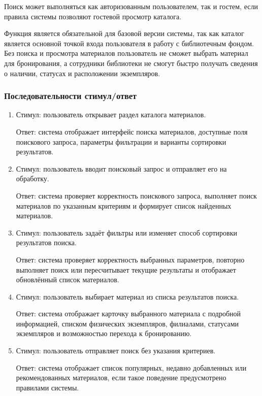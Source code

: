 \documentclass[12pt,a4paper]{article}
\begin{document}
	Поиск может выполняться как авторизованным пользователем, так и гостем, если
	правила системы позволяют гостевой просмотр каталога.
	
	Функция является обязательной для базовой версии системы, так как каталог
	является основной точкой входа пользователя в работу с библиотечным фондом.
	Без поиска и просмотра материалов пользователь не сможет выбрать материал
	для бронирования, а сотрудники библиотеки не смогут быстро получать сведения
	о наличии, статусах и расположении экземпляров.
	
	\subsubsection{Последовательности стимул/ответ}
	
	\begin{enumerate}
		\item Стимул: пользователь открывает раздел каталога материалов.
		
		Ответ: система отображает интерфейс поиска материалов, доступные поля
		поискового запроса, параметры фильтрации и варианты сортировки результатов.
		
		\item Стимул: пользователь вводит поисковый запрос и отправляет его на обработку.
		
		Ответ: система проверяет корректность поискового запроса, выполняет поиск
		материалов по указанным критериям и формирует список найденных материалов.
		
		\item Стимул: пользователь задаёт фильтры или изменяет способ сортировки
		результатов поиска.
		
		Ответ: система проверяет корректность выбранных параметров, повторно
		выполняет поиск или пересчитывает текущие результаты и отображает обновлённый
		список материалов.
		
		\item Стимул: пользователь выбирает материал из списка результатов поиска.
		
		Ответ: система отображает карточку выбранного материала с подробной
		информацией, списком физических экземпляров, филиалами, статусами экземпляров
		и возможностью перехода к бронированию.
		
		\item Стимул: пользователь отправляет поиск без указания критериев.
		
		Ответ: система отображает список популярных, недавно добавленных или
		рекомендованных материалов, если такое поведение предусмотрено правилами
		системы.
		

\end{enumerate}
\end{document}
